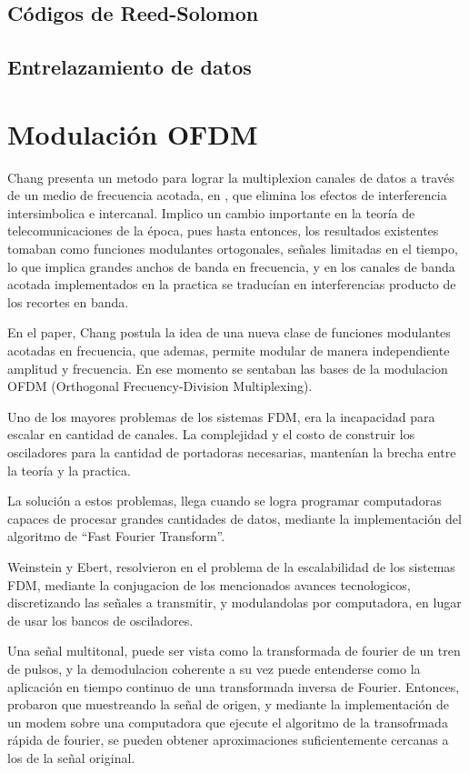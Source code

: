 	\subsection{C\'odigos de Reed-Solomon}
	\subsection{Entrelazamiento de datos}

\section{Modulación OFDM}

Chang presenta un metodo para lograr la multiplexion canales de datos a través de un medio de frecuencia acotada, en \cite{chang-ofdm}, que elimina los efectos de interferencia intersimbolica e intercanal. Implico un cambio importante en la teoría de telecomunicaciones de la época, pues hasta entonces, los resultados existentes tomaban como funciones modulantes ortogonales, señales limitadas en el tiempo, lo que implica grandes anchos de banda en frecuencia, y en los canales de banda acotada implementados en la practica se traducían en interferencias producto de los recortes en banda. 

En el paper, Chang postula la idea de una nueva clase de funciones modulantes acotadas en frecuencia, que ademas, permite modular de manera independiente amplitud y frecuencia. En ese momento se sentaban las bases de la modulacion OFDM (Orthogonal Frecuency-Division Multiplexing).

Uno de los mayores problemas de los sistemas FDM, era la incapacidad para escalar en cantidad de canales. La complejidad y el costo de construir los osciladores para la cantidad de portadoras necesarias, mantenían la brecha entre la teoría y la practica. 

La solución a estos problemas, llega cuando se logra programar computadoras capaces de procesar grandes cantidades de datos, mediante la implementación del algoritmo de “Fast Fourier Transform”. 

Weinstein y Ebert, resolvieron en \cite{discrete-ofdm} el problema de la escalabilidad de los sistemas FDM, mediante la conjugacion de los mencionados avances tecnologicos, discretizando las señales a transmitir, y modulandolas por computadora, en lugar de usar los bancos de osciladores. 

Una señal multitonal, puede ser vista como la transformada de fourier de un tren de pulsos, y la demodulacion coherente a su vez puede entenderse como la aplicación en tiempo continuo de una transformada inversa de Fourier. Entonces, probaron que muestreando la señal de origen, y mediante la implementación de un modem sobre una computadora que ejecute el algoritmo de la transofrmada rápida de fourier, se pueden obtener aproximaciones suficientemente cercanas a los de la señal original. 


